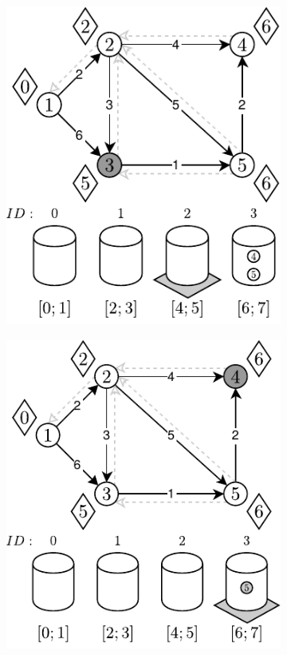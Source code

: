 \begin{figure}[!htbp]
	\ContinuedFloat
	\centering
	\begin{subfigure}[b]{0.3\textwidth}
		\includegraphics[width=\textwidth]{Chapter_II/APROXIMATE-BUCKETS-Example/d.pdf}
		\caption{}
	\end{subfigure}%
	\begin{subfigure}[b]{0.3\textwidth}
		\includegraphics[width=\textwidth]{Chapter_II/APROXIMATE-BUCKETS-Example/e.pdf}

\end{subfigure}
\end{figure}
